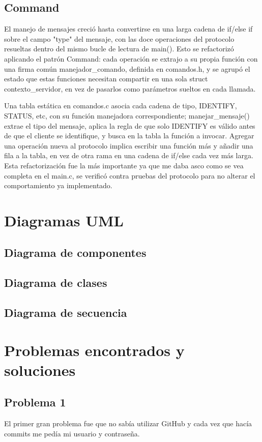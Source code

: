 \documentclass[12pt,a4paper]{article}
\begin{document}
\subsection{Command}
El manejo de mensajes creció hasta convertirse en una larga cadena de
if/else if sobre el campo "type" del mensaje, con las doce
operaciones del protocolo resueltas dentro del mismo bucle de lectura de
main(). Esto se refactorizó aplicando el patrón Command: cada
operación se extrajo a su propia función con una firma común
manejador\_comando, definida en comandos.h, y se agrupó el
estado que estas funciones necesitan compartir en una sola
struct contexto\_servidor, en vez de pasarlos como parámetros sueltos
en cada llamada.

Una tabla estática en comandos.c asocia cada cadena de tipo, 
IDENTIFY, STATUS, etc, con su función manejadora
correspondiente; manejar\_mensaje() extrae el tipo del mensaje,
aplica la regla de que solo IDENTIFY es válido antes de que el
cliente se identifique, y busca en la tabla la función a invocar. Agregar una operación nueva al protocolo implica escribir 
una función más y añadir una fila a la tabla, en vez de otra rama en una cadena de 
if/else cada vez más larga. Esta refactorización fue la más importante ya que me daba asco como se vea completa en el main.c, 
se verificó contra pruebas del protocolo para no alterar el comportamiento ya implementado.

\section{Diagramas UML}

\subsection{Diagrama de componentes}

\subsection{Diagrama de clases}

\subsection{Diagrama de secuencia}

\section{Problemas encontrados y soluciones}
\subsection{Problema 1}
El primer gran problema fue que no sabía utilizar GitHub y cada vez 
que hacía commits me pedía mi usuario y contraseña.
\end{document}
